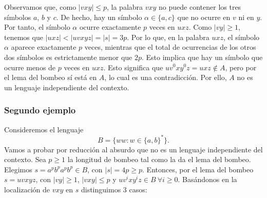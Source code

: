 \documentclass[twoside]{article}
\begin{document}
Observamos que, como $|vxy|\leq p$, la palabra $vxy$ no puede contener los tres símbolos $a$, $b$ y $c$. De hecho, hay un símbolo $\alpha\in\{a,c\}$ que no ocurre en $v$ ni en $y$. Por tanto, el símbolo $\alpha$ ocurre exactamente $p$ veces en $uxz$. Como $|vy|\geq 1$, tenemos que $|uxz|<|uvxyz|=|s|=3p$. Por lo que, en la palabra $uxz$, el símbolo $\alpha$ aparece exactamente $p$ veces, mientras que el total de ocurrencias de los otros dos símbolos es estrictamente menor que $2p$. Esto implica que hay un símbolo que ocurre menos de $p$ veces en $uxz$. Esto significa que $uv^0xy^0z=uxz\notin A$, pero por el lema del bombeo sí está en $A$, lo cual es una contradicción. Por ello, $A$ no es un lenguaje independiente del contexto.

\newpage

\subsubsection{Segundo ejemplo}
Consideremos el lenguaje 
$$B=\{ww:w\in\{a,b\}^*\}.$$
Vamos a probar por reducción al absurdo que no es un lenguaje independiente del contexto. Sea $p\geq 1$ la longitud de bombeo tal como la da el lema del bombeo. Elegimos $s=a^pb^pa^pb^p\in B$, con $|s|=4p\geq p$. Entonces, por el lema del bombeo $s=uvxyz$, con $|vy|\geq 1$, $|vxy|\leq p$ y $uv^ixy^iz\in B\ \forall i\geq 0$. Basándonos en la localización de $vxy$ en $s$ distinguimos 3 casos:
\end{document}

